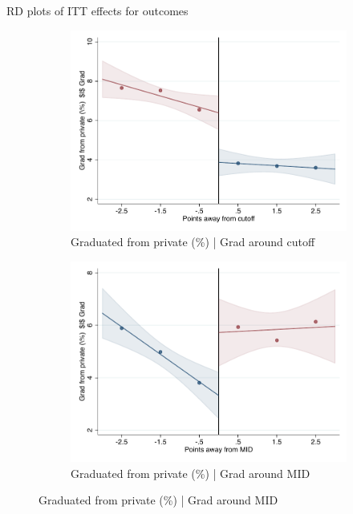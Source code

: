 \documentclass[notes,11pt, aspectratio=169]{beamer}
\begin{document}
\begin{frame}{RD plots of ITT effects for outcomes}
\hyperlink{ITT_rd_plot_IPN}{}
\begin{figure}

    \begin{subfigure}{0.45\textwidth}
        \centering
        \caption{Graduated from private (\%) | Grad around cutoff}
        \includegraphics[width=\textwidth]{04_Figures/rd_plot_tau_ENLACE_Privado_IPN3.pdf}
    \end{subfigure}
    \begin{subfigure}{0.45\textwidth}
        \centering
        \caption{Graduated from private (\%) | Grad around MID}
        \includegraphics[width=\textwidth]{04_Figures/rd_plot_mid_ENLACE_Privado_IPN3.pdf}
    \end{subfigure}
    
\end{figure}
\end{frame}
\end{document}
